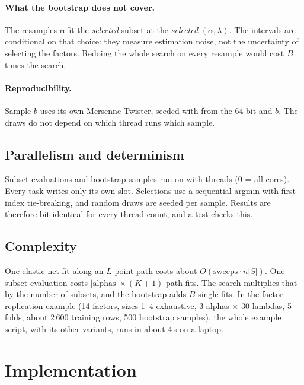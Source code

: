 \documentclass[11pt,a4paper]{article}
\begin{document}
\paragraph{What the bootstrap does not cover.} The resamples refit the \emph{selected} subset
at the \emph{selected} $(\alpha,\lambda)$. The intervals are conditional on that choice: they
measure estimation noise, not the uncertainty of selecting the factors. Redoing the whole
search on every resample would cost $B$ times the search.

\paragraph{Reproducibility.} Sample $b$ uses its own Mersenne Twister, seeded with
 from the 64-bit  and $b$. The draws do not depend
on which thread runs which sample.

\subsection{Parallelism and determinism}\label{sec:parallel}
Subset evaluations and bootstrap samples run on  with
 threads (0 = all cores). Every task writes only its own slot. Selections
use a sequential argmin with first-index tie-breaking, and random draws are seeded per
sample. Results are therefore bit-identical for every thread count, and a test checks this.

\subsection{Complexity}
One elastic net fit along an $L$-point path costs about $O(\text{sweeps}\cdot n|S|)$. One
subset evaluation costs $|\text{alphas}|\times(K+1)$ path fits. The search multiplies that by
the number of subsets, and the bootstrap adds $B$ single fits. In the factor replication
example (14 factors, sizes 1--4 exhaustive, 3 alphas $\times$ 30 lambdas, 5 folds, about
2\,600 training rows, 500 bootstrap samples), the whole example script, with its other
variants, runs in about 4\,s on a laptop.

\section{Implementation}
\end{document}

